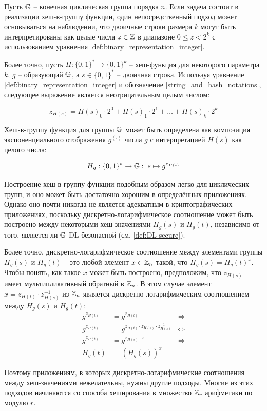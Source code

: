 \begin{example}\label{naive-cyclic-group-hash} Пусть $\mathbb{G}$ -- конечная циклическая группа порядка $n$. Если задача состоит в реализации хеш-в-группу функции, один непосредственный подход может основываться на наблюдении, что двоичные строки размера $k$ могут быть интерпретированы как целые числа $z\in\mathbb{Z}$ в диапазоне $0\leq z < 2^k$ с использованием уравнения \ref{def:binary_representation_integer}.

Более точно, пусть $H:\{{0,1}\}^*\to \{0,1\}^k$ -- хеш-функция для некоторого параметра $k$, $g$ -- образующий $\mathbb{G}$, а $s\in\{0,1\}^*$ -- двоичная строка. Используя уравнение \ref{def:binary_representation_integer} и обозначение \ref{string_and_hash_notations}, следующее выражение является неотрицательным целым числом:

\begin{equation}
z_{H(s)}= H(s)_0\cdot 2^0 + H(s)_1\cdot 2^1 + \ldots + H(s)_k \cdot 2^k
\end{equation}

Хеш-в-группу функция для группы $\mathbb{G}$ может быть определена как композиция экспоненциального отображения $g^{(\cdot)}$ числа $g$ с интерпретацией $H(s)$ как целого числа:

\begin{equation}
H_{g} : \{0,1\}^* \to \mathbb{G}:\; s \mapsto g^{z_{H(s)}}
\end{equation}

Построение хеш-в-группу функции подобным образом легко для циклических групп, и оно может быть достаточно хорошим в определённых приложениях. Однако оно почти никогда не является адекватным в криптографических приложениях, поскольку дискретно-логарифмическое соотношение может быть построено между некоторыми хеш-значениями $H_g(s)$ и $H_g(t)$, независимо от того, является ли $\mathbb{G}$ DL-безопасной (см. \secname \ref{def:DL-secure}).

Более точно, дискретно-логарифмическое соотношение между элементами группы $H_g(s)$ и $H_g(t)$ -- это любой элемент $x\in \mathbb{Z}_n$ такой, что $H_g(s) = H_g(t)^x$. Чтобы понять, как такое $x$ может быть построено, предположим, что $z_{H(s)}$ имеет мультипликативный обратный в $\mathbb{Z}_n$. В этом случае элемент $x=z_{H(t)}\cdot z_{H(s)}^{-1}$ из $\mathbb{Z}_n$ является дискретно-логарифмическим соотношением между $H_g(s)$ и $H_g(t)$:
\begin{align*}
g^{z_{H(t)}} & = g^{z_{H(t)}} & \Leftrightarrow\\
g^{z_{H(t)}} & = g^{z_{H(t)}\cdot z_{H(s)}\cdot z_{H(s)}^{-1}} & \Leftrightarrow \\
g^{z_{H(t)}} & = g^{z_{H(s)}\cdot x} & \Leftrightarrow \\
H_g(t) & = (H_g(s))^x
\end{align*}
\end{example}
Поэтому приложениям, в которых дискретно-логарифмические соотношения между хеш-значениями нежелательны, нужны другие подходы. Многие из этих подходов начинаются со способа хеширования в множество $\mathbb{Z}_r$ арифметики по модулю $r$.

